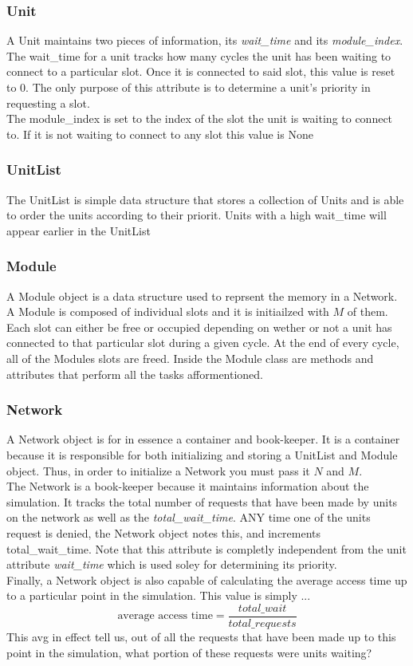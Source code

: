 \documentclass[12pt]{article}
\begin{document}
\subsubsection*{Unit}
A Unit maintains two pieces of information, its \textit{wait\_time} and its
\textit{module\_index}. The wait\_time for a unit tracks how many cycles
the unit has been waiting to connect to a particular slot. Once it is connected
to said slot, this value is reset to 0. The only purpose of this attribute
is to determine a unit's priority in requesting a slot. \\
The module\_index is set to the index of the slot the unit is waiting
to connect to. If it is not waiting to connect to any slot this value is None

\subsubsection*{UnitList}
The UnitList is simple data structure that stores a collection of Units
and is able to order the units according to their priorit. Units
with a high wait\_time will appear earlier in the UnitList 

\subsubsection*{Module}
A Module object is a data structure used to reprsent the memory in 
a Network. A Module is composed of individual slots and it is initiailzed
with $M$ of them. Each slot can either be free or occupied depending on 
wether or not a unit has connected to that particular slot during a given cycle.
At the end of every cycle, all of the Modules slots are freed. Inside
the Module class are methods and attributes that perform all the tasks 
afformentioned.

\subsubsection*{Network}
A Network object is for in essence a container and book-keeper. 
It is a container because it is responsible for both
initializing and storing a UnitList and Module object. 
Thus, in order to initialize a Network you must pass it
$N$ and $M$.  \\
The Network is a book-keeper because it maintains information about the 
simulation. It tracks the total number of requests that have been made 
by units on the network as well as the \textit{total\_wait\_time}. 
ANY time one of the units request is denied, the Network object notes this, 
and increments
total\_wait\_time. Note that this attribute is completly independent from 
the unit attribute \textit{wait\_time} which is used soley for determining
its priority. \\
Finally, a Network object is also capable of calculating the 
average access time up to a particular point in the simulation. This value
is simply ...
$$\text{average access time} = \frac{total\_wait}{total\_requests}$$
This avg in effect tell us, out of all the requests that have been made
up to this point in the simulation, what portion of these requests
were units waiting?\\
\end{document}
